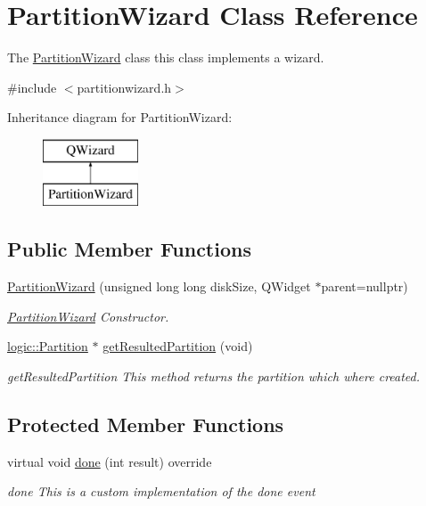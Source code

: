 \hypertarget{class_partition_wizard}{}\section{Partition\+Wizard Class Reference}
\label{class_partition_wizard}


The \mbox{\hyperlink{class_partition_wizard}{Partition\+Wizard}} class this class implements a wizard.  




{\ttfamily \#include $<$partitionwizard.\+h$>$}

Inheritance diagram for Partition\+Wizard\+:\begin{figure}[H]
\begin{center}
\leavevmode
\includegraphics[height=2.000000cm]{class_partition_wizard}
\end{center}
\end{figure}
\subsection*{Public Member Functions}
\begin{DoxyCompactItemize}
\item 
\mbox{\hyperlink{class_partition_wizard_aab98955e5371a971ac94b7f0d4b24258}{Partition\+Wizard}} (unsigned long long disk\+Size, Q\+Widget $\ast$parent=nullptr)
\begin{DoxyCompactList}\small\item\em \mbox{\hyperlink{class_partition_wizard}{Partition\+Wizard}} Constructor. \end{DoxyCompactList}\item 
\mbox{\hyperlink{classlogic_1_1_partition}{logic\+::\+Partition}} $\ast$ \mbox{\hyperlink{class_partition_wizard_acb892f63fce0cff304f72df4771b4f05}{get\+Resulted\+Partition}} (void)
\begin{DoxyCompactList}\small\item\em get\+Resulted\+Partition This method returns the partition which where created. \end{DoxyCompactList}\end{DoxyCompactItemize}
\subsection*{Protected Member Functions}
\begin{DoxyCompactItemize}
\item 
virtual void \mbox{\hyperlink{class_partition_wizard_af5141307f45f8fc9bd091c718a0f31b6}{done}} (int result) override
\begin{DoxyCompactList}\small\item\em done This is a custom implementation of the done event \end{DoxyCompactList}\end{DoxyCompactItemize}


